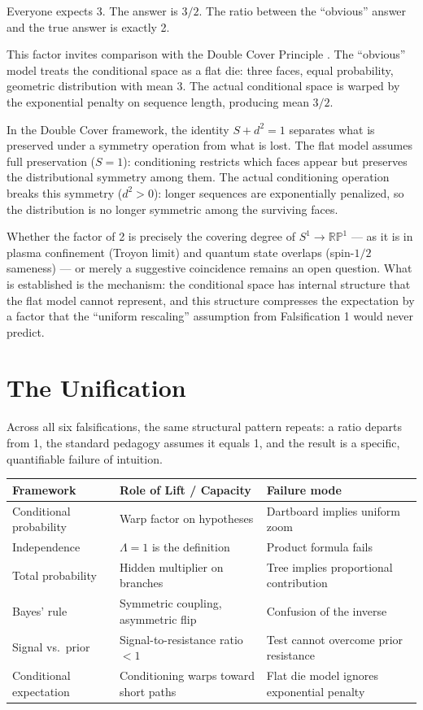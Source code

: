 \documentclass[12pt]{article}
\begin{document}
Everyone expects 3. The answer is $3/2$. The ratio between the ``obvious'' answer and the true answer is exactly 2.

This factor invites comparison with the Double Cover Principle \cite{davis2026doublecover}. The ``obvious'' model treats the conditional space as a flat die: three faces, equal probability, geometric distribution with mean 3. The actual conditional space is warped by the exponential penalty on sequence length, producing mean $3/2$.

In the Double Cover framework, the identity $S + d^2 = 1$ separates what is preserved under a symmetry operation from what is lost. The flat model assumes full preservation ($S = 1$): conditioning restricts which faces appear but preserves the distributional symmetry among them. The actual conditioning operation breaks this symmetry ($d^2 > 0$): longer sequences are exponentially penalized, so the distribution is no longer symmetric among the surviving faces.

Whether the factor of 2 is precisely the covering degree of $S^1 \to \mathbb{RP}^1$ --- as it is in plasma confinement (Troyon limit) and quantum state overlaps (spin-$1/2$ sameness) --- or merely a suggestive coincidence remains an open question. What is established is the mechanism: the conditional space has internal structure that the flat model cannot represent, and this structure compresses the expectation by a factor that the ``uniform rescaling'' assumption from Falsification 1 would never predict.

\section{The Unification}

Across all six falsifications, the same structural pattern repeats: a ratio departs from 1, the standard pedagogy assumes it equals 1, and the result is a specific, quantifiable failure of intuition.

\begin{table}[h!]
\centering
\small
\begin{tabular}{@{}p{3.2cm}p{4cm}p{5.5cm}@{}}
\toprule
\textbf{Framework} & \textbf{Role of Lift / Capacity} & \textbf{Failure mode} \\
\midrule
Conditional probability & Warp factor on hypotheses & Dartboard implies uniform zoom \\
Independence & $\Lambda = 1$ is the definition & Product formula fails \\
Total probability & Hidden multiplier on branches & Tree implies proportional contribution \\
Bayes' rule & Symmetric coupling, asymmetric flip & Confusion of the inverse \\
Signal vs.\ prior & Signal-to-resistance ratio $< 1$ & Test cannot overcome prior resistance \\
Conditional expectation & Conditioning warps toward short paths & Flat die model ignores exponential penalty \\
\bottomrule
\end{tabular}
\end{table}
\end{document}
